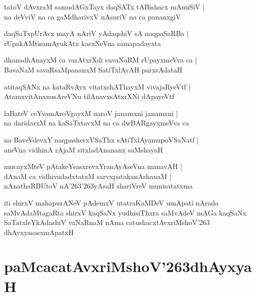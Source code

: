 \documentclass[twoside,12pt,openright]{book}
\def\S{\char'263}
\newcounter{shloka}[chapter]
\begin{document}
\begin{shloka}%
tatoV dAvxraM samudAGxTayx daqSATx tABishacx mAnuSiV |\\
na deVviV na ca gaMdharivxV nAsuriV na ca pananxgiV 
\end{shloka}

\begin{shloka}%
daqSaTxpUrAvx mayA nAriV yAdaqshiV sA naqpaSaRBa |\\
rUpakAMtisamAyukAtx kasxNeVna samapadayxta
\end{shloka}

\begin{shloka}%
dhanadhAnayxM ca vasAtxrXdi suvaNaRM rUpayxmeVva ca |\\
BavaNaM savaRsaMpananxM SatiTxlAyAH parxsAdataH 
\end{shloka}

\begin{shloka}%
atitaqSANx na kataRvAyx vitatxshAThayxM vivajaRyeVtf |\\
AtamxvitAnxnusAreVNu tilAnavxsAtxrXNi dApayeVtf
\end{shloka}

\begin{shloka}%
laBateV ceYvamAroVgayxM naroV janamxni janamxni |\\
na daridarxM na kaSaTxtavxM na ca dwBARgayxmeVva ca 
\end{shloka}

\begin{shloka}%
na BaveVdevxY naqpasherxVSaThx sAtiTxlAyamupoVSaNatf |\\
aneVna vidhinA rAjaM sitxladAnananx saMshayaH 
\end{shloka}

\begin{shloka}%
mucayxMteV pAtakeYsasxrevxYranAyAseVna manavAH |\\
dAnaM ca vidhivadadxtatxM sarvxpatakanAshanaM |\\
nAnathaRBUtoV nA\S\S yAsaH shariVreV munisatatxma
\end{shloka}

\begin{center}
iti shirxV mahapurANeV pAdemxV utatraKaMDeV umApati nArada saMvAdaMtagaRta shirxV kaqSaNx 
yudhisiThxra saMvAdeV mAGa kaqSaNx SaTatxleYkAdashiV vaNaRnaM nAma catushacxtAvxriMshoV\S 
dhAyxyasasxmApatxH
\end{center}

\chapter{paMcacatAvxriMshoV\S dhAyxyaH}
\end{document}

